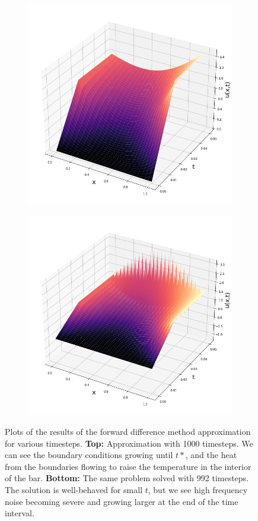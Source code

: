 \documentclass[12pt]{article}
\begin{document}
\begin{figure}
\centering
\begin{subfigure}{.7\linewidth}
\includegraphics[width=\linewidth]{good.png}
\end{subfigure} %
\begin{subfigure}{.7\linewidth}
\includegraphics[width=\linewidth]{bad.png}
\end{subfigure}
\caption{Plots of the results of the forward difference method approximation for various timesteps. \textbf{Top:} Approximation with 1000 timesteps. We can see the boundary conditions growing until $t*$, and the heat from the boundaries flowing to raise the temperature in the interior of the bar. \textbf{Bottom:} The same problem solved with 992 timesteps. The solution is well-behaved for small $t$, but we see high frequency noise becoming severe and growing larger at the end of the time interval. }
\end{figure}
\end{document}
